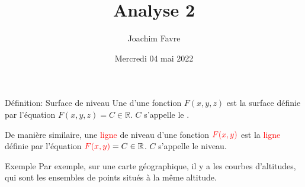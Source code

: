 \documentclass[a4paper]{article}
\title{Analyse 2}
\author{Joachim Favre}
\date{Mercredi 04 mai 2022}
\begin{document}
\maketitle


\begin{parag}{Définition: Surface de niveau}
    Une  d'une fonction $F\left(x, y, z\right)$ est la surface définie par l'équation $F\left(x, y, z\right) = C \in \mathbb{R}$. $C$ s'appelle le .

    De manière similaire, une \textcolor{red}{ligne} de niveau d'une fonction ${\color{red}F\left(x, y\right)}$ est la \textcolor{red}{ligne} définie par l'équation ${\color{red}F\left(x, y\right)} = C \in \mathbb{R}$. $C$ s'appelle le niveau.

    \begin{subparag}{Exemple}
        Par exemple, sur une carte géographique, il y a les courbes d'altitudes, qui sont les ensembles de points situés à la même altitude.

    \end{subparag}
\end{parag}
\end{document}
